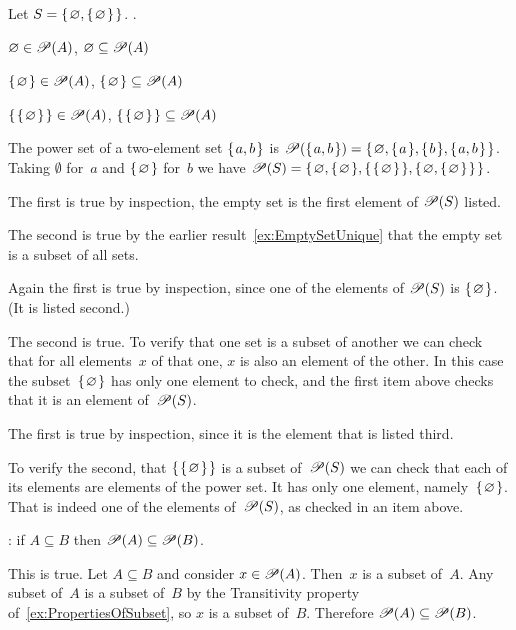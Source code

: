 \documentclass{ibl}  %
\begin{document}
\begin{ex}  Let $S=\mbox{$\{\hspace{0.1em}\varnothing,\mbox{$\{\hspace{0.1em}\varnothing\hspace{0.1em}\}$}\hspace{0.1em}\}$}$. \pord.
\begin{exes}
\item $\varnothing\in\mathscr{P}(A)$, 
  $\varnothing\subseteq\mathscr{P}(A)$    
\item $\mbox{$\{\hspace{0.1em}\varnothing\hspace{0.1em}\}$}\in\mathscr{P}(A)$, 
  $\mbox{$\{\hspace{0.1em}\varnothing\hspace{0.1em}\}$}\subseteq\mathscr{P}(A)$    
\item $\mbox{$\{\hspace{0.1em}\mbox{$\{\hspace{0.1em}\varnothing\hspace{0.1em}\}$}\hspace{0.1em}\}$}\in\mathscr{P}(A)$,    
  $\mbox{$\{\hspace{0.1em}\mbox{$\{\hspace{0.1em}\varnothing\hspace{0.1em}\}$}\hspace{0.1em}\}$}\subseteq\mathscr{P}(A)$    
\end{exes}
\begin{ans}
The power set of a two-element set $\mbox{$\{\hspace{0.1em}a,b\hspace{0.1em}\}$}$ is 
$\mathscr{P}(\mbox{$\{\hspace{0.1em}a,b\hspace{0.1em}\}$})=\mbox{$\{\hspace{0.1em}\varnothing,\mbox{$\{\hspace{0.1em}a\hspace{0.1em}\}$},\mbox{$\{\hspace{0.1em}b\hspace{0.1em}\}$},\mbox{$\{\hspace{0.1em}a,b\hspace{0.1em}\}$}\hspace{0.1em}\}$}$.
Taking $\emptyset$ for~$a$ and $\mbox{$\{\hspace{0.1em}\varnothing\hspace{0.1em}\}$}$ for~$b$ we have
$\mathscr{P}(S)=\mbox{$\{\hspace{0.1em}\varnothing, \mbox{$\{\hspace{0.1em}\varnothing\hspace{0.1em}\}$}, \mbox{$\{\hspace{0.1em}\mbox{$\{\hspace{0.1em}\varnothing\hspace{0.1em}\}$}\hspace{0.1em}\}$}, 
                   \mbox{$\{\hspace{0.1em}\varnothing, \mbox{$\{\hspace{0.1em}\varnothing\hspace{0.1em}\}$}\hspace{0.1em}\}$}\hspace{0.1em}\}$}$.
\begin{exes}
\item The first is true by inspection, the empty set is the first element
  of $\mathscr{P}(S)$ listed.

  The second is true by the earlier result~\ref{ex:EmptySetUnique}
  that the empty set is a subset of all sets.
\item Again the first is true by inspection, 
  since one of the elements of $\mathscr{P}(S)$ is 
  $\mbox{$\{\hspace{0.1em}\varnothing\hspace{0.1em}\}$}$.  (It is listed second.)

  The second is true.
  To verify that one set is a subset of another we can check that for all
  elements~$x$ of that one, $x$ is also an element of the other.
  In this case the subset~$\mbox{$\{\hspace{0.1em}\varnothing\hspace{0.1em}\}$}$ has only one element to check,
  and the first item above checks that it is an element of~$\mathscr{P}(S)$.
\item The first is true by inspection, since it is the element that is listed
  third.

  To verify the second,
  that $\mbox{$\{\hspace{0.1em}\mbox{$\{\hspace{0.1em}\varnothing\hspace{0.1em}\}$}\hspace{0.1em}\}$}$ is a subset of~$\mathscr{P}(S)$
  we can check that each of its elements are elements of the power set.
  It has only one element, namely~$\mbox{$\{\hspace{0.1em}\varnothing\hspace{0.1em}\}$}$.
  That is indeed one of the elements of~$\mathscr{P}(S)$, as checked in 
  an item above. 
\end{exes}
\end{ans}
\end{ex}

\begin{ex} \pord:
if $A\subseteq B$ then $\mathscr{P}(A)\subseteq\mathscr{P}(B)$.  
\begin{ans}
This is true.
Let $A\subseteq B$ and consider $x\in\mathscr{P}(A)$.
Then~$x$ is a subset of~$A$.
Any subset of~$A$ is a subset of~$B$ by 
the Transitivity property of~\ref{ex:PropertiesOfSubset},
so $x$ is a subset of~$B$.
Therefore $\mathscr{P}(A)\subseteq\mathscr{P}(B)$.
\end{ans}
\end{ex}
\end{document}
